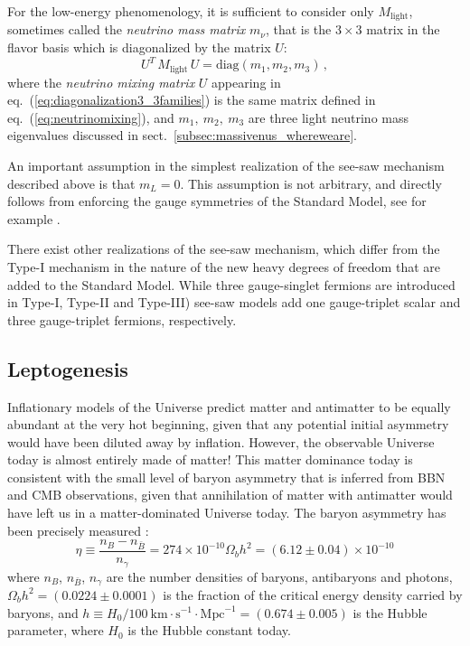 For the low-energy phenomenology, it is sufficient to consider only $M_{\text{light}}$, sometimes called the \emph{neutrino mass matrix} $m_{\nu}$, that is the $3\times3$ matrix in the flavor basis which is diagonalized by the matrix $U$:
%
\begin{equation}
U^T \, M_{\text{light}} \, U
=
\text{diag}\!\left(m_1,m_2,m_3\right)
\,,
\label{eq:diagonalization3_3families}
\end{equation}
%
\noindent where the \emph{neutrino mixing matrix} $U$ appearing in eq.~(\ref{eq:diagonalization3_3families}) is the same matrix defined in eq.~(\ref{eq:neutrinomixing}), and $m_1,\ m_2,\ m_3$ are three light neutrino mass eigenvalues discussed in sect.~\ref{subsec:massivenus_whereweare}.

An important assumption in the simplest realization of the see-saw mechanism described above is that $m_L=0$. This assumption is not arbitrary, and directly follows from enforcing the gauge symmetries of the Standard Model, see for example \cite{Giunti:2003qt}. 

There exist other realizations of the see-saw mechanism, which differ from the Type-I mechanism in the nature of the new heavy degrees of freedom that are added to the Standard Model. While three gauge-singlet fermions are introduced in Type-I, Type-II and Type-III) see-saw models add one gauge-triplet scalar and three gauge-triplet fermions, respectively. 



\subsection{\label{subsec:massivenus_leptogenesis}Leptogenesis}

Inflationary models of the Universe predict matter and antimatter to be equally abundant at the very hot beginning, given that any potential initial asymmetry would have been diluted away by inflation. However, the observable Universe today is almost entirely made of matter! This matter dominance today is consistent with the small level of baryon asymmetry that is inferred from BBN and CMB observations, given that annihilation of matter with antimatter would have left us in a matter-dominated Universe today. The baryon asymmetry has been precisely measured \cite{ParticleDataGroup:2022pth,Planck:2018vyg}:
%
\begin{equation}
\eta \equiv \frac{n_B-n_{\bar{B}}}{n_{\gamma}} = 274\times 10^{-10}\Omega_bh^2 = (6.12\pm 0.04)\times 10^{-10} \label{eq:measuredbaryonasymmetry}
\end{equation}
%
where $n_B$, $n_{\bar{B}}$, $n_{\gamma}$ are the number densities of baryons, antibaryons and photons, $\Omega_bh^2=(0.0224\pm 0.0001)$ is the fraction of the critical energy density carried by baryons, and $h\equiv H_0/100\ \text{km}\cdot\text{s}^{-1}\cdot\text{Mpc}^{-1}=(0.674\pm 0.005)$ is the Hubble parameter, where $H_0$ is the Hubble constant today.

